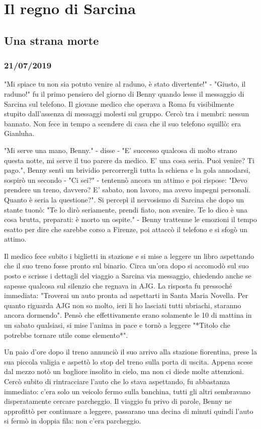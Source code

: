 \chapter{Il regno di Sarcina}
\section{Una strana morte}
\subsection*{21/07/2019}


"Mi spiace tu non sia potuto venire al raduno, è stato divertente!" - "Giusto, il raduno!" fu il primo pensiero del giorno di Benny quando lesse il messaggio di Sarcina sul telefono. Il giovane medico che operava a Roma fu visibilmente stupito dall'assenza di messaggi molesti sul gruppo. Cercò tra i membri: nessun bannato. Non fece in tempo a scendere di casa che il suo telefono squillò: era Gianluha.

"Mi serve una mano, Benny." - disse - "E' successo qualcosa di molto strano questa notte, mi serve il tuo parere da medico. E' una cosa seria. Puoi venire? Ti pago.", Benny sentì un brividio percorrergli tutta la schiena e la gola annodarsi, sospirò un secondo - "Ci sei?" - tentennò ancora un attimo e poi rispose: "Devo prendere un treno, davvero? E' sabato, non lavoro, ma avevo impegni personali. Quanto è seria la questione?". 
Si percepì il nervosismo di Sarcina che dopo un stante tuonò: "Te lo dirò seriamente, prendi fiato, non svenire. Te lo dico è una cosa brutta, preparati: è morto un ospite." - Benny trattenne le emozioni il tempo esatto per dire che sarebbe corso a Firenze, poi attaccò il telefono e si sfogò un attimo.

Il medico fece subito i biglietti in stazione e si mise a leggere un libro aspettando che il suo treno fosse pronto sul binario. Circa un'ora dopo si accomodò sul suo posto e scrisse i dettagli del viaggio a Sarcina via messaggio, chiedendo anche se sapesse qualcosa sul silenzio che regnava in AJG.
La risposta fu pressoché immediata: "Troverai un auto pronta ad aspettarti in Santa Maria Novella. Per quanto riguarda AJG non so molto, ieri li ho lasciati tutti ubriachi, staranno ancora dormendo".
Pensò che effettivamente erano solamente le 10 di mattina in un sabato qualsiasi, si mise l'anima in pace e tornò a leggere "*Titolo che potrebbe tornare utile come elemento*".

Un paio d'ore dopo il treno annunciò il suo arrivo alla stazione fiorentina, prese la sua piccola valigia e aspettò lo stop del treno sulla porta di uscita. Appena scese dal mezzo notò un bagliore insolito in cielo, ma non ci diede molte attenzioni. Cercò subito di rintracciare l'auto che lo stava aspettando, fu abbastanza immediato: c'era solo un veicolo fermo sulla banchina, tutti gli altri sembravano disperatamente cercare parcheggio.
Il viaggio fu privo di parole, Benny ne approfittò per continuare a leggere, passarano una decina di minuti quindi l'auto si fermò in doppia fila: non c'era parcheggio. 

